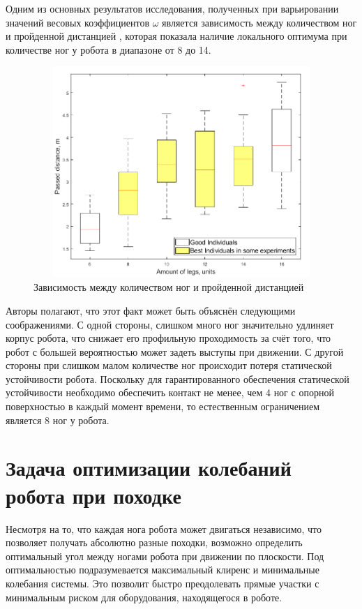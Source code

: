 Одним из основных результатов исследования, полученных при варьировании значений весовых коэффициентов $\omega$ является зависимость между количеством ног и пройденной дистанцией , которая показала наличие локального оптимума при количестве ног у робота в диапазоне от 8 до 14. 

\begin{figure}[H]
    \centering\includegraphics[height=8cm,width=1\textwidth,keepaspectratio]{images/box_plot_structural_synthesis.png}
    \caption{Зависимость между количеством ног и пройденной дистанцией}
    \label{fig:box_plot_structural_synthesis.png}
\end{figure}

Авторы полагают, что этот факт может быть объяснён следующими соображениями. С одной стороны, слишком много ног значительно удлиняет корпус робота, что снижает его профильную проходимость за счёт того, что робот с большей вероятностью может задеть выступы при движении. С другой стороны при слишком малом количестве ног происходит потеря статической устойчивости робота. Поскольку для гарантированного обеспечения статической устойчивости необходимо обеспечить контакт не менее, чем 4 ног с опорной поверхностью в каждый момент времени, то естественным ограничением является 8 ног у робота.


\section{Задача оптимизации колебаний робота при походке}
Несмотря на то, что каждая нога робота может двигаться независимо, что позволяет получать абсолютно разные походки, возможно определить оптимальный угол между ногами робота при движении по плоскости. Под оптимальностью подразумевается максимальный клиренс и минимальные колебания системы. Это позволит быстро преодолевать прямые участки с минимальным риском для оборудования, находящегося в роботе.

